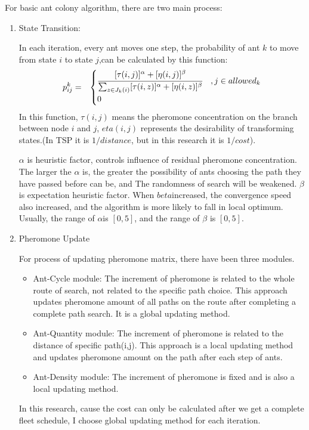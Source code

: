 \documentclass[senior]{IPSstyle}
\begin{document}
For basic ant colony algorithm, there are two main process:
\begin{enumerate}
    \item State Transition:
    
    In each iteration, every ant moves one step, the probability of ant \(k\) to move from state \(i\) to state \(j\),can be calculated by this function:
    \begin{eqnarray}\label{probability}
    p_{ij}^k &=&
    \begin{cases}
    \cfrac{[\tau(i,j)]^\alpha +[\eta(i,j)]^\beta}{\sum_{z\in J_k(i)} [\tau(i,z)]^\alpha +[\eta(i,z)]^\beta} &, j\in allowed_k \cr
    0 \cr
    \end{cases}
    \end{eqnarray}
    In this function, \(\tau(i,j)\) means the pheromone concentration on the branch between node \(i\) and \(j\), \(eta(i,j)\) represents the desirability of transforming states.(In TSP it is \(1/distance\), but in this research it is \(1/cost\)). 
    
    \(\alpha\) is heuristic factor, controls influence of residual pheromone concentration. The larger the \(\alpha\) is, the greater the possibility of ants choosing the path they have passed before can be, and The randomness of search will be weakened. \(\beta\) is expectation heuristic factor. When \(beta\)increased, the convergence speed also increased, and the algorithm is more likely to fall in local optimum. 
    Usually, the range of \(\alpha\)is \([0,5]\), and the range of \(\beta\) is  \([0,5]\).
    \item Pheromone Update
    
    For process of updating pheromone matrix, there have been three modules.
    \begin{itemize}
        \item Ant-Cycle module:  The increment of pheromone is related to the whole route of search, not related to the specific path choice. This approach updates pheromone amount of all paths on the route after completing a complete path search. It is a global updating method.
        \item Ant-Quantity module: The increment of pheromone is related to the distance of specific path(i,j). This approach is a local updating method and updates pheromone amount on the path after each step of ants.
        \item Ant-Density module: The increment of pheromone is fixed and is also a local updating method.
    \end{itemize}
    In this research, cause the cost can only be calculated after we get a complete fleet schedule, I choose global updating method for each iteration.
    

\end{enumerate}
\end{document}
